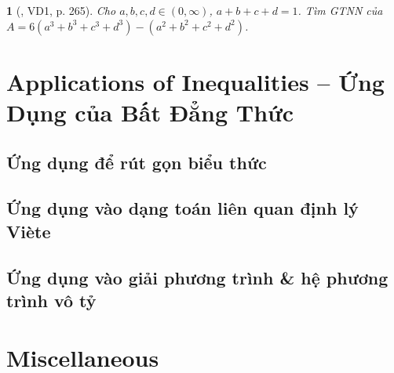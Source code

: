\documentclass{article}
\newtheorem{baitoan}{}
\begin{document}
\begin{baitoan}[\cite{Khai_Huong_bdt}, VD1, p. 265]
	Cho $a,b,c,d\in(0,\infty)$, $a + b + c + d = 1$. Tìm {\rm GTNN} của $A = 6(a^3 + b^3 + c^3 + d^3) - (a^2 + b^2 + c^2 + d^2)$.
\end{baitoan}


\section{Applications of Inequalities -- Ứng Dụng của Bất Đẳng Thức}

\subsection{Ứng dụng để rút gọn biểu thức}

\subsection{Ứng dụng vào dạng toán liên quan định lý Vi\`ete}

\subsection{Ứng dụng vào giải phương trình \& hệ phương trình vô tỷ}


\section{Miscellaneous}


\printbibliography[heading=bibintoc]
\end{document}
